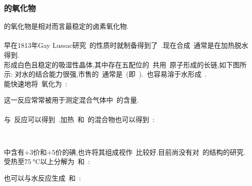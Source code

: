 \documentclass{ctexbook}
\begin{document}
\subsubsection{的氧化物}
的氧化物是相对而言最稳定的卤素氧化物.
\paragraph{}
早在1813年Gay Lussac研究~的性质时就制备得到了~.现在合成~通常是在加热脱水得到.\\
\indent {}形成白色且稳定的吸湿性晶体,其中存在五配位的~共用~原子形成的长链,如下图所示:
对水的结合能力很强,市售的~通常是~(即~).~也容易溶于水形成~.\\
\indent {}能快速地将~氧化为~:
\begin{tightcenter}
\end{tightcenter}
这一反应常常被用于测定混合气体中~的含量.\\
\paragraph{}
\indent {}与~反应可以得到~.加热~和~的混合物也可以得到~:
\begin{tightcenter}
    \\
\end{tightcenter}
中含有$+3$价和$+5$价的碘,也许将其组成视作~比较好.目前尚没有对~的结构的研究.受热至$\SI{75}{\celsius}$以上分解为~和~:
\begin{tightcenter}
\end{tightcenter}
也可以与水反应生成~和~:
\begin{tightcenter}
\end{tightcenter}
\end{document}
